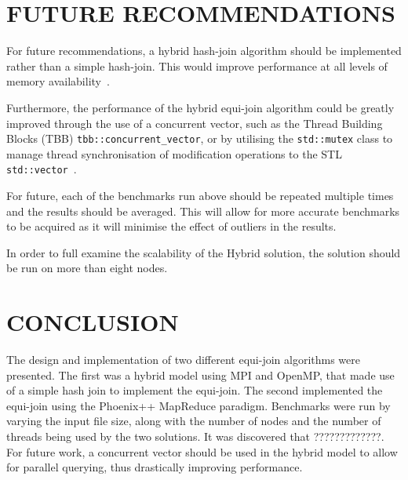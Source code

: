 \documentclass[12pt,twocolumn]{witseiepaper}
\begin{document}
\section{FUTURE RECOMMENDATIONS}
For future recommendations, a hybrid hash-join algorithm should be implemented rather than a simple hash-join. This would improve performance at all levels of memory availability~\cite{evaluating4JoinAlgorithms}.

Furthermore, the performance of the hybrid equi-join algorithm could be greatly improved through the use of a concurrent vector, such as the Thread Building Blocks (TBB) \texttt{tbb::concurrent\_vector}, or by utilising the \texttt{std::mutex} class to manage thread synchronisation of modification operations to the STL \texttt{std::vector}~\cite{tbb,mutex}.

For future, each of the benchmarks run above should be repeated multiple times and the results should be averaged. This will allow for more accurate benchmarks to be acquired as it will minimise the effect of outliers in the results.

In order to full examine the scalability of the Hybrid solution, the solution should be run on more than eight nodes.

\section{CONCLUSION}
The design and implementation of two different equi-join algorithms were presented. The first was a hybrid model using MPI and OpenMP, that made use of a simple hash join to implement the equi-join. The second implemented the equi-join using the Phoenix++ MapReduce paradigm. Benchmarks were run by varying the input file size, along with the number of nodes and the number of threads being used by the two solutions. It was discovered that ?????????????. For future work, a concurrent vector should be used in the hybrid model to allow for parallel querying, thus drastically improving performance.


{
	{\small

}
}
\end{document}
